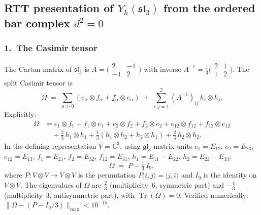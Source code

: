
\subsection*{RTT presentation of $Y_\hbar(\mathfrak{sl}_3)$
  from the ordered bar complex $d^2=0$}

\subsubsection*{1.\ The Casimir tensor}

The Cartan matrix of $\mathfrak{sl}_3$ is
$A = \bigl(\begin{smallmatrix} 2 & -1 \\ -1 & 2 \end{smallmatrix}\bigr)$
with inverse
$A^{-1} = \tfrac{1}{3}\bigl(\begin{smallmatrix} 2 & 1 \\ 1 & 2 \end{smallmatrix}\bigr)$.
The split Casimir tensor is
\begin{equation}\label{eq:sl3-casimir}
\Omega \;=\;
  \sum_{\alpha > 0} (e_\alpha \otimes f_\alpha + f_\alpha \otimes e_\alpha)
  \;+\; \sum_{i,j=1}^{2} (A^{-1})_{ij}\, h_i \otimes h_j.
\end{equation}
Explicitly:
\begin{align*}
\Omega &= e_1 \otimes f_1 + f_1 \otimes e_1
  + e_2 \otimes f_2 + f_2 \otimes e_2
  + e_{12} \otimes f_{12} + f_{12} \otimes e_{12} \\
  &\quad + \tfrac{2}{3}\, h_1 \otimes h_1
  + \tfrac{1}{3}(h_1 \otimes h_2 + h_2 \otimes h_1)
  + \tfrac{2}{3}\, h_2 \otimes h_2.
\end{align*}
In the defining representation $V = \mathbb{C}^3$,
using $\mathfrak{gl}_3$ matrix units
$e_1 = E_{12}$, $e_2 = E_{23}$, $e_{12} = E_{13}$,
$f_1 = E_{21}$, $f_2 = E_{32}$, $f_{12} = E_{31}$,
$h_1 = E_{11} - E_{22}$, $h_2 = E_{22} - E_{33}$:
\begin{equation}\label{eq:casimir-perm}
\Omega \;=\; P - \tfrac{1}{3}\, I_9,
\end{equation}
where $P \colon V \otimes V \to V \otimes V$ is the permutation
$P|i,j\rangle = |j,i\rangle$ and $I_9$ is the identity on
$V \otimes V$.  The eigenvalues of $\Omega$ are
$\tfrac{2}{3}$ (multiplicity~$6$, symmetric part)
and $-\tfrac{4}{3}$ (multiplicity~$3$, antisymmetric part),
with $\operatorname{Tr}(\Omega) = 0$.
Verified numerically: $\|\Omega - (P - I_9/3)\|_{\max} < 10^{-15}$.

